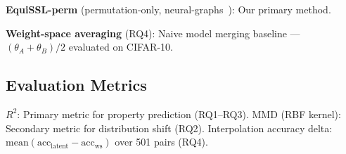 \textbf{EquiSSL-perm} (permutation-only, neural-graphs~\cite{Kofinas2024Graph}):
Our primary method.

\textbf{Weight-space averaging} (RQ4):
Naive model merging baseline --- $(\theta_A + \theta_B)/2$ evaluated on CIFAR-10.

\subsection*{Evaluation Metrics}

$R^2$: Primary metric for property prediction (RQ1--RQ3).
MMD (RBF kernel): Secondary metric for distribution shift (RQ2).
Interpolation accuracy delta: $\text{mean}(\text{acc}_\text{latent} - \text{acc}_\text{ws})$
over 501 pairs (RQ4).
